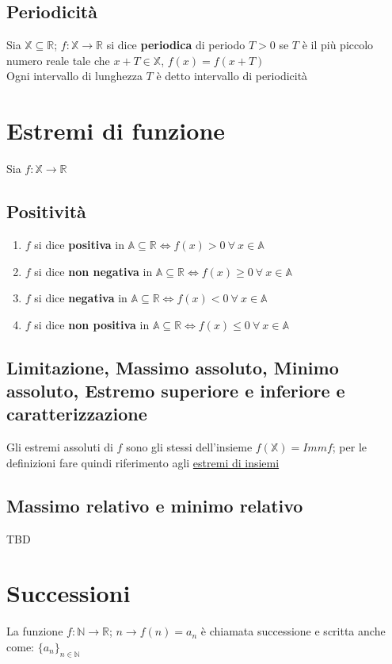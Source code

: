 \subsection{Periodicità}
Sia $\mathbb{X} \subseteq \mathbb{R}$;   $f: \mathbb{X} \rightarrow \mathbb{R}$ si dice \textbf{periodica} di periodo $T>0$ se $T$ è il più piccolo numero reale tale che $x + T \in \mathbb{X}$, $f(x) = f(x + T)$\\
Ogni intervallo di lunghezza $T$ è detto intervallo di periodicità

\section{Estremi di funzione}
Sia $f: \mathbb{X} \rightarrow \mathbb{R}$
\subsection{Positività}
\begin{enumerate}
\item $f$ si dice \textbf{positiva} in $\mathbb{A} \subseteq \mathbb{R} \iff f(x)>0\ \forall\ x \in \mathbb{A}$
\item $f$ si dice \textbf{non negativa} in $\mathbb{A} \subseteq \mathbb{R} \iff f(x) \geq 0\ \forall\ x \in \mathbb{A}$
\item $f$ si dice \textbf{negativa} in $\mathbb{A} \subseteq \mathbb{R} \iff f(x)<0\ \forall\ x \in \mathbb{A}$
\item $f$ si dice \textbf{non positiva} in $\mathbb{A} \subseteq \mathbb{R} \iff f(x) \leq 0\ \forall\ x \in \mathbb{A}$
\end{enumerate}
\subsection{Limitazione, Massimo assoluto, Minimo assoluto, Estremo superiore e inferiore e caratterizzazione}
Gli estremi assoluti di $f$ sono gli stessi dell'insieme $f(\mathbb{X}) = Immf$; per le definizioni fare quindi riferimento agli \hyperref[sec: estremiInsiemi]{estremi di insiemi}
\subsection{Massimo relativo e minimo relativo}
TBD
\section{Successioni}
La funzione $f: \mathbb{N} \rightarrow \mathbb{R}$;  $n \rightarrow f(n) = a_n$ è chiamata successione e scritta anche come: $\{a_n\}_{n \in \mathbb{N}}$

